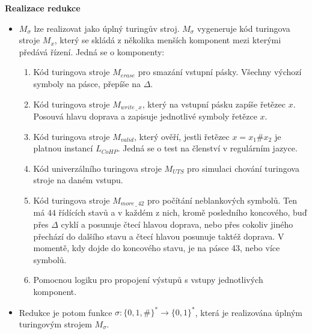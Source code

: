 \documentclass[11pt, a4paper, titlepage]{article}
\begin{document}
\textbf{Realizace redukce}
\bigskip

\begin{itemize}

\item $M_\sigma$ lze realizovat jako úplný turingův stroj. $M_\sigma$ vygeneruje kód turingova stroje $M_x$, který se skládá z několika menších komponent mezi kterými předává řízení. Jedná se o komponenty:

\begin{enumerate}

\item Kód turingova stroje $M_{erase}$ pro smazání vstupní pásky. Všechny výchozí symboly na pásce, přepíše na $\Delta$.

\item Kód turingova stroje $M_{write\,\_\,x}$, který na vstupní pásku zapíše řetězec $x$. Posouvá hlavu doprava a zapisuje jednotlivé symboly řetězce $x$.

\item Kód turingova stroje $M_{valid}$, který ověří, jestli řetězec $x = x_1 \# x_2$ je platnou instancí $L_{CoHP}$. Jedná se o test na členství v regulárním jazyce.

\item Kód univerzálního turingova stroje $M_{UTS}$ pro simulaci chování turingova stroje na daném vstupu.

\item Kód turingova stroje $M_{more\,\_\,42}$ pro počítání neblankových symbolů. Ten má $44$ řídících stavů a v každém z nich, kromě posledního koncového, buď přes $\Delta$ cyklí a posunuje čtecí hlavou doprava, nebo přes cokoliv jiného přechází do dalšího stavu a čtecí hlavou posunuje taktéž doprava. V momentě, kdy dojde do koncového stavu, je na pásce 43, nebo více symbolů.

\item Pomocnou logiku pro propojení výstupů s vstupy jednotlivých komponent.

\end{enumerate}

\item Redukce je potom funkce $\sigma : \{0, 1, \#\}^* \rightarrow \{0, 1\}^*$, která je realizována úplným turingovým strojem $M_\sigma$.

\end{itemize}






\end{document}

